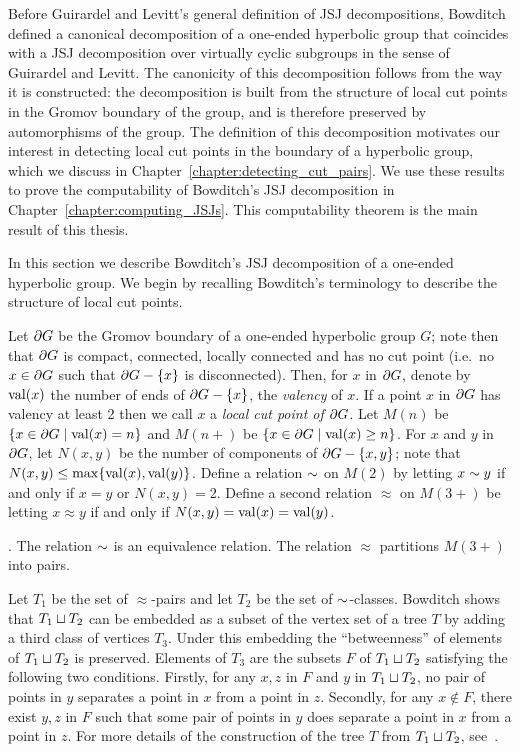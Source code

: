 Before Guirardel and Levitt's general definition of JSJ decompositions, Bowditch defined a canonical decomposition of a one-ended hyperbolic group that coincides with a JSJ decomposition over virtually cyclic subgroups in the sense of Guirardel and Levitt.
The canonicity of this decomposition follows from the way it is constructed: the decomposition is built from the structure of local cut points in the Gromov boundary of the group, and is therefore preserved by automorphisms of the group.
The definition of this decomposition motivates our interest in detecting local cut points in the boundary of a hyperbolic group, which we discuss in Chapter~\ref{chapter:detecting_cut_pairs}.
We use these results to prove the computability of Bowditch's JSJ decomposition in Chapter~\ref{chapter:computing_JSJs}.
This computability theorem is the main result of this thesis.

In this section we describe Bowditch's JSJ decomposition of a one-ended hyperbolic group.
We begin by recalling Bowditch's terminology to describe the structure of local cut points.

Let $\partial G$ be the Gromov boundary of a one-ended hyperbolic group $G$; note then that $\partial G$ is compact, connected, locally connected and has no cut point (i.e.\ no $x \in \partial G$ such that $\partial G - \{x\}$ is disconnected).
Then, for $x$ in $\partial G$, denote by $\operatorname{\mathrm{val}}(x)$ the number of ends of $\partial G - \{x\}$, the \emph{valency} of $x$.
If a point $x$ in $\partial G$ has valency at least 2 then we call $x$ a \emph{local cut point of $\partial G$}.
Let $M(n)$ be $\{x \in \partial G \mid \operatorname{\mathrm{val}}(x) = n\}$ and $M(n{+})$ be $\{x \in \partial G \mid \operatorname{\mathrm{val}}(x) \geq n\}$.
For $x$ and $y$ in $\partial G$, let $N(x, y)$ be the number of components of $\partial G - \{x, y\}$; note that $N(x, y) \leq \max\{\operatorname{\mathrm{val}}(x), \operatorname{\mathrm{val}}(y)\}$.
Define a relation $\sim$ on $M(2)$ by letting $x \sim y$ if and only if $x = y$ or $N(x, y) = 2$. 
Define a second relation $\approx$ on $M(3{+})$ be letting $x \approx y$ if and only if $N(x, y) = \operatorname{\mathrm{val}}(x) = \operatorname{\mathrm{val}}(y)$.

\begin{lemma}\cite[Lemma 3.1, Lemma 3.8, Proposition 5.13]{bowditch98}.
  The relation $\sim$ is an equivalence relation.
  The relation $\approx$ partitions $M(3{+})$ into pairs. 
\end{lemma}

Let $T_1$ be the set of $\approx$-pairs and let $T_2$ be the set of $\sim$-classes.
Bowditch shows that $T_1 \sqcup T_2$ can be embedded as a subset of the vertex set of a tree $T$ by adding a third class of vertices $T_3$. 
Under this embedding the ``betweenness'' of elements of $T_1 \sqcup T_2$ is preserved.
Elements of $T_3$ are the subsets $F$ of $T_1 \sqcup T_2$ satisfying the following two conditions. Firstly, for any $x,z$ in $F$ and $y$ in $T_1 \sqcup T_2$, no pair of points in $y$ separates a point in $x$ from a point in $z$.
Secondly, for any $x \notin F$, there exist $y,z$ in $F$ such that some pair of points in $y$ does separate a point in $x$ from a point in $z$.
For more details of the construction of the tree $T$ from $T_1 \sqcup T_2$, see~\cite[Section 2]{bowditch98}.

